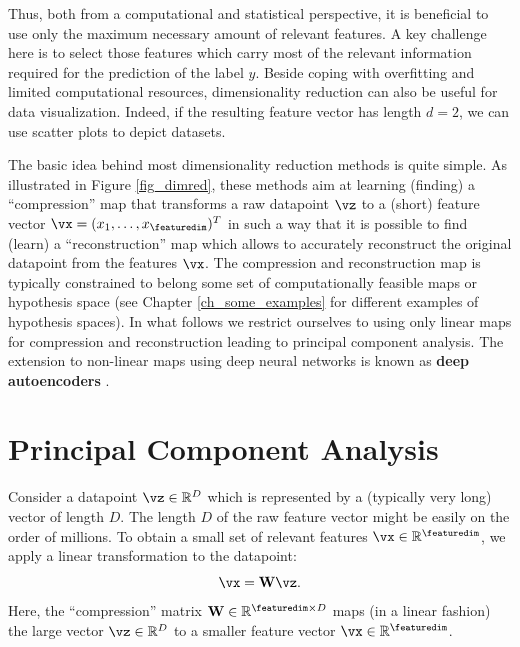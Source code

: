 \documentclass[12pt]{report}
\begin{document}
Thus, both from a computational and statistical perspective, it is beneficial to use 
only the maximum necessary amount of relevant features. A key challenge here is 
to select those features which carry most of the relevant information required for 
the prediction of the label $y$. Beside coping with overfitting and limited computational 
resources, dimensionality reduction can also be useful for data visualization. Indeed, if 
the resulting feature vector has length $d=2$, we can use scatter plots to depict datasets. 

The basic idea behind most dimensionality reduction methods is quite simple. As 
illustrated in Figure \ref{fig_dimred}, these methods aim at learning (finding) a ``compression'' 
map that transforms a raw datapoint $\vz$ to a (short) feature vector $\vx=(x_{1},\ldots,x_{\featuredim})^{T}$ 
in such a way that it is possible to find (learn) a ``reconstruction'' map which allows to accurately 
reconstruct the original datapoint from the features $\vx$. The compression and reconstruction 
map is typically constrained to belong some set of computationally feasible maps or hypothesis 
space (see Chapter \ref{ch_some_examples} for different examples of hypothesis spaces). In what 
follows we restrict ourselves to using only linear maps for compression and reconstruction leading 
to principal component analysis. The extension to non-linear maps using deep neural networks 
is known as {\bf deep autoencoders} \cite[Ch. 14]{Goodfellow-et-al-2016}. 


\section{Principal Component Analysis} 
\label{sec_pca}

Consider a datapoint $\vz \in \mathbb{R}^{D}$ which is represented by a (typically very long) 
vector of length $D$. The length $D$ of the raw feature vector might be easily on the order of 
millions. To obtain a small set of relevant features $\vx \in \mathbb{R}^{\featuredim}$, we apply 
a linear transformation to the datapoint: 
\begin{equation} 
\label{equ_feat_learning_matrix}
\vx = \mathbf{W} \vz.
\end{equation}
Here, the ``compression'' matrix $\mathbf{W} \in \mathbb{R}^{\featuredim \times D}$ maps 
(in a linear fashion) the large vector $\vz \in \mathbb{R}^{D}$ to a smaller feature vector $\vx \in \mathbb{R}^{\featuredim}$. %
\end{document}
